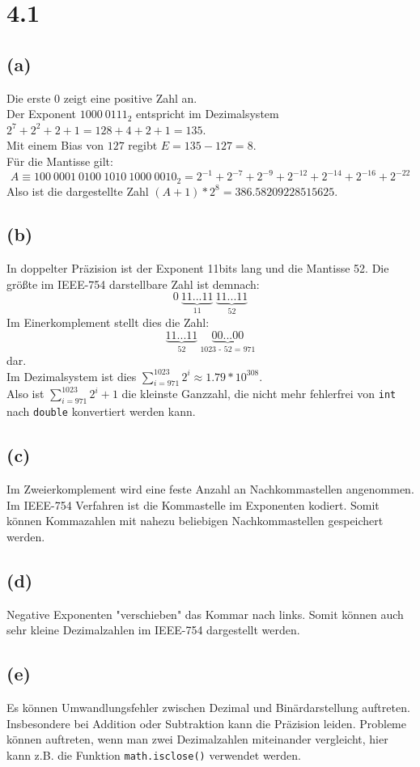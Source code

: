 \section*{4.1}
\subsection*{(a)}
Die erste $0$ zeigt eine positive Zahl an.\\
Der Exponent $1000\ 0111_2$ entspricht im Dezimalsystem $2^7 + 2^2 + 2 + 1 = 128 + 4 + 2 + 1 = 135$.\\
Mit einem Bias von $127$ regibt $E = 135 - 127 = 8$.\\
Für die Mantisse gilt: 
$$A \equiv 100\ 0001\ 0100\ 1010\ 1000\ 0010_2 = 2^{-1} + 2^{-7} + 2^{-9} + 2^{-12} + 2^{-14} + 2^{-16} + 2^{-22}$$
Also ist die dargestellte Zahl $(A + 1) * 2^8 = 386.58209228515625$.

\subsection*{(b)}
In doppelter Präzision ist der Exponent 11bits lang und die Mantisse 52. Die größte im IEEE-754 darstellbare Zahl ist demnach:
$$0\ \underbrace{11...11}_\text{11}\ \underbrace{11...11}_\text{52}$$
Im Einerkomplement stellt dies die Zahl:
$$\underbrace{11...11}_\text{52}\ \underbrace{00...00}_\text{1023 - 52 = 971}$$
dar.\\
Im Dezimalsystem ist dies $\sum_{i = 971}^{1023} 2^i \approx 1.79 * 10^{308}$.\\
Also ist $\sum_{i = 971}^{1023} 2^i + 1$ die kleinste Ganzzahl, die nicht mehr fehlerfrei von \verb+int+ nach \verb+double+ konvertiert werden kann.

\subsection*{(c)}
Im Zweierkomplement wird eine feste Anzahl an Nachkommastellen angenommen. Im IEEE-754 Verfahren ist die Kommastelle im Exponenten kodiert. Somit können Kommazahlen mit nahezu  beliebigen Nachkommastellen gespeichert werden.

\subsection*{(d)}
Negative Exponenten "verschieben" das Kommar nach links. Somit können auch sehr kleine Dezimalzahlen im IEEE-754 dargestellt werden.

\subsection*{(e)}
Es können Umwandlungsfehler zwischen Dezimal und Binärdarstellung auftreten.
Insbesondere bei Addition oder Subtraktion kann die Präzision leiden.
Probleme können auftreten, wenn man zwei Dezimalzahlen miteinander vergleicht, hier kann z.B. die Funktion \verb+math.isclose()+ verwendet werden.\cite{skript}

